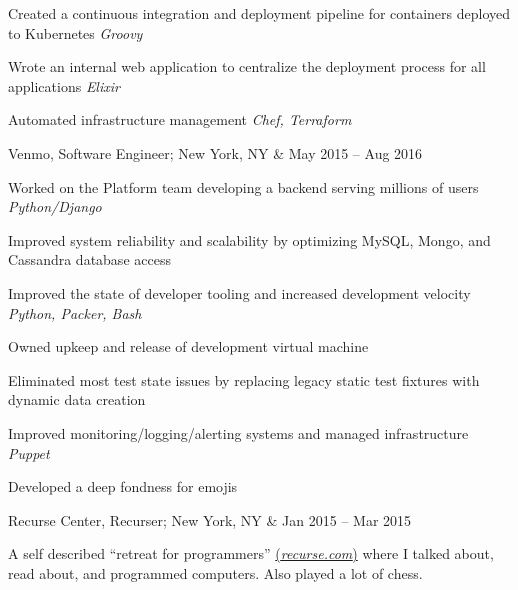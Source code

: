 \documentclass[letterpaper,hidelinks]{scrartcl}
\begin{document}
\begin{list1}
\begin{list2}
  \item Created a continuous integration and deployment pipeline for containers deployed to Kubernetes \hfill\emph{Groovy}
  \item Wrote an internal web application to centralize the deployment process for all applications \hfill\emph{Elixir}
  \item Automated infrastructure management \hfill\emph{Chef, Terraform}
  \end{list2}

\item \begin{tabular1bold} Venmo, Software Engineer; New York, NY & May 2015 -- Aug 2016 \end{tabular1bold}

  \begin{list2}
  \item Worked on the Platform team developing a backend serving millions of users \hfill \emph{Python/Django}

    \begin{list3}
    \item Improved system reliability and scalability by optimizing MySQL, Mongo, and Cassandra database access
    \end{list3}

  \item Improved the state of developer tooling and increased development velocity \hfill \emph{Python, Packer, Bash}

    \begin{list3}
    \item Owned upkeep and release of development virtual machine
    \item Eliminated most test state issues by replacing legacy static test fixtures with dynamic data creation
    \end{list3}

  \item Improved monitoring/logging/alerting systems and managed infrastructure \hfill \emph{Puppet}
  \item Developed a deep fondness for emojis
  \end{list2}

\item \begin{tabular1bold} Recurse Center, Recurser; New York, NY &  Jan 2015 -- Mar 2015 \end{tabular1bold}

  \begin{list2}
  \item A self described ``retreat for programmers'' \href{https://recurse.com}{(\emph{recurse.com})} where I talked about, read about, and programmed computers. Also played a lot of chess.
  \end{list2}


\end{list1}
\end{document}
